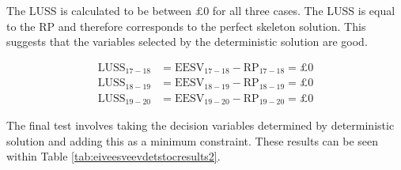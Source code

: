 \documentclass[../thesis.tex]{subfiles}
\begin{document}
The LUSS is calculated to be between $\pounds$0 for all three cases. The LUSS is equal to the RP and therefore corresponds to the perfect skeleton solution. This suggests that the variables selected by the deterministic solution are good.

\begin{align}
    \text{LUSS}_{17-18} &= \text{EESV}_{17-18} - \text{RP}_{17-18} = \pounds0   \\
    \text{LUSS}_{18-19} &= \text{EESV}_{18-19} - \text{RP}_{18-19} = \pounds0  \\
    \text{LUSS}_{19-20} &= \text{EESV}_{19-20} - \text{RP}_{19-20} = \pounds0
\end{align}

The final test involves taking the decision variables determined by deterministic solution and adding this as a minimum constraint. These results can be seen within Table \ref{tab:eiveesveevdetstocresults2}. 
\end{document}
